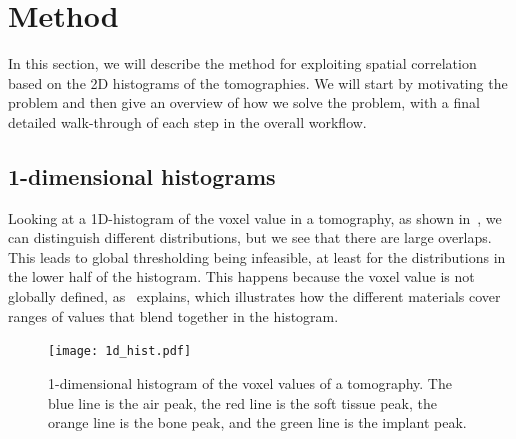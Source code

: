 \section{Method}
\label{sec:method}

In this section, we will describe the method for exploiting spatial correlation
based on the 2D histograms of the tomographies. We will start by motivating the
problem and then give an overview of how we solve the problem, with a final
detailed walk-through of each step in the overall workflow.


\subsection{1-dimensional histograms}
Looking at a 1D-histogram of the voxel value in a tomography, as shown
in~, we can distinguish different distributions, but we see
that there are large overlaps. This leads to global thresholding being
infeasible, at least for the distributions in the lower half of the histogram.
This happens because the voxel value is not globally defined,
as~ explains, which illustrates how the different materials
cover ranges of values that blend together in the histogram.

\begin{figure}
    \centering
    \texttt{[image: 1d\_hist.pdf]}
    \caption{1-dimensional histogram of the voxel values of a tomography. The
    blue line is the air peak, the red line is the soft tissue peak, the orange
    line is the bone peak, and the green line is the implant peak.}
    \label{fig:1d-hist}
\end{figure}

